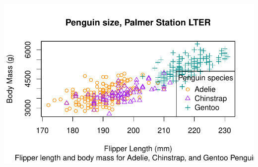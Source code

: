 \documentclass[
  letterpaper,
  DIV=11,
  numbers=noendperiod]{scrreprt}
\begin{document}
\includegraphics{scripts/02_dataViz/class4_files/figure-pdf/unnamed-chunk-3-1.pdf}
\end{document}
